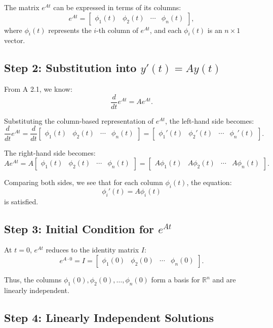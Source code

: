 \documentclass[12pt]{article}
\begin{document}
The matrix \(e^{At}\) can be expressed in terms of its columns:
\[
e^{At} = \begin{bmatrix} 
\phi_1(t) & \phi_2(t) & \cdots & \phi_n(t)
\end{bmatrix},
\]
where \(\phi_i(t)\) represents the \(i\)-th column of \(e^{At}\), and each \(\phi_i(t)\) is an \(n \times 1\) vector.

\subsection*{Step 2: Substitution into \(y'(t) = Ay(t)\)}

From A 2.1, we know:
\[
\frac{d}{dt} e^{At} = A e^{At}.
\]

Substituting the column-based representation of \(e^{At}\), the left-hand side becomes:
\[
\frac{d}{dt} e^{At} = \frac{d}{dt} \begin{bmatrix} 
\phi_1(t) & \phi_2(t) & \cdots & \phi_n(t)
\end{bmatrix} 
= \begin{bmatrix} 
\phi_1'(t) & \phi_2'(t) & \cdots & \phi_n'(t)
\end{bmatrix}.
\]

The right-hand side becomes:
\[
A e^{At} = A \begin{bmatrix} 
\phi_1(t) & \phi_2(t) & \cdots & \phi_n(t)
\end{bmatrix} 
= \begin{bmatrix} 
A \phi_1(t) & A \phi_2(t) & \cdots & A \phi_n(t)
\end{bmatrix}.
\]

Comparing both sides, we see that for each column \(\phi_i(t)\), the equation:
\[
\phi_i'(t) = A \phi_i(t)
\]
is satisfied.

\subsection*{Step 3: Initial Condition for \(e^{At}\)}

At \(t = 0\), \(e^{At}\) reduces to the identity matrix \(I\):
\[
e^{A \cdot 0} = I = \begin{bmatrix} 
\phi_1(0) & \phi_2(0) & \cdots & \phi_n(0)
\end{bmatrix}.
\]

Thus, the columns \(\phi_1(0), \phi_2(0), \ldots, \phi_n(0)\) form a basis for \(\mathbb{R}^n\) and are linearly independent.

\subsection*{Step 4: Linearly Independent Solutions}
\end{document}
